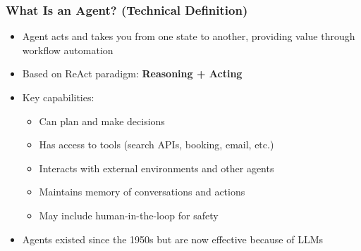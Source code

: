 \begin{frame}[fragile]\frametitle{What Is an Agent? (Technical Definition)}
\begin{itemize}
    \item Agent acts and takes you from one state to another, providing value through workflow automation
    \item Based on ReAct paradigm: \textbf{Reasoning + Acting}
    \item Key capabilities:
    \begin{itemize}
        \item Can plan and make decisions
        \item Has access to tools (search APIs, booking, email, etc.)
        \item Interacts with external environments and other agents
        \item Maintains memory of conversations and actions
        \item May include human-in-the-loop for safety
    \end{itemize}
    \item Agents existed since the 1950s but are now effective because of LLMs
\end{itemize}
\end{frame}


